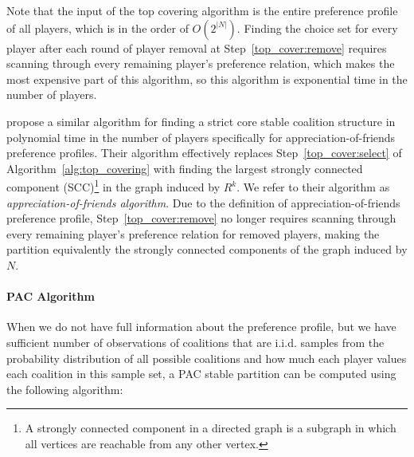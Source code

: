Note that the input of the top covering algorithm is the entire preference profile
of all players, which is in the order of $O(2^{|N|})$.
Finding the choice set for every player after each round of player removal at
Step~\ref{top_cover:remove} requires scanning through every remaining player's
preference relation, which makes the most expensive part of this algorithm,
so this algorithm is exponential time in the number of players.

 propose a similar algorithm for finding a strict core
stable coalition structure in polynomial time in the number of players
specifically for appreciation-of-friends preference profiles.
Their algorithm effectively replaces Step~\ref{top_cover:select} of
Algorithm~\ref{alg:top_covering} with finding the largest strongly connected
component (SCC)\footnote{A strongly connected component in a directed graph is
a subgraph in which all vertices are reachable from any other vertex.} in the
graph induced by $R^k$.
We refer to their algorithm as \textit{appreciation-of-friends algorithm}.
Due to the definition of appreciation-of-friends preference profile,
Step~\ref{top_cover:remove} no longer requires scanning through every remaining
player's preference relation for removed players, making the partition
equivalently the strongly connected components of the graph induced by $N$.


\paragraph{PAC Algorithm}
\label{para:pac_algo}

When we do not have full information about the preference profile, but we have
sufficient number of observations of coalitions that are i.i.d. samples from
the probability distribution of all possible coalitions and how much each player
values each coalition in this sample set, a PAC stable partition can be computed
using the following algorithm:

